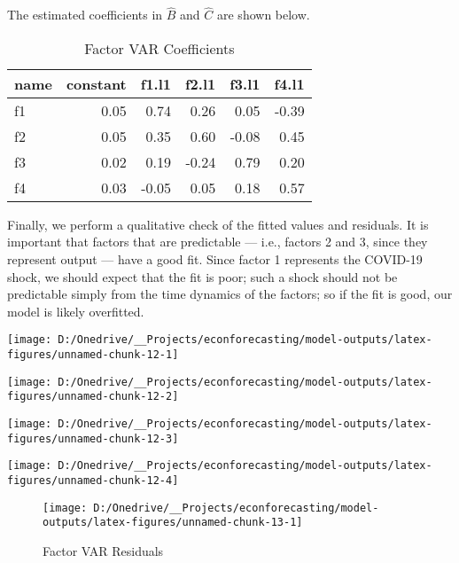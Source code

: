 \documentclass[11pt, letterpaper]{article}\usepackage[]{graphicx}\usepackage[]{color}
\begin{document}
The estimated coefficients in $\widehat{B}$ and $\widehat{C}$ are shown below.
\begin{table}[H]
\centering
\begingroup\footnotesize
\begin{tabular}{lrrrrr}
  \hline
name & constant & f1.l1 & f2.l1 & f3.l1 & f4.l1 \\ 
  \hline
f1 & 0.05 & 0.74 & 0.26 & 0.05 & -0.39 \\ 
  f2 & 0.05 & 0.35 & 0.60 & -0.08 & 0.45 \\ 
  f3 & 0.02 & 0.19 & -0.24 & 0.79 & 0.20 \\ 
  f4 & 0.03 & -0.05 & 0.05 & 0.18 & 0.57 \\ 
   \hline
\end{tabular}
\endgroup
\caption{Factor VAR Coefficients} 
\end{table}



Finally, we perform a qualitative check of the fitted values and residuals. It is important that factors that are predictable --- i.e., factors 2 and 3, since they represent output --- have a good fit. Since factor 1 represents the COVID-19 shock, we should expect that the fit is poor; such a shock should not be predictable simply from the time dynamics of the factors; so if the fit is good, our model is likely overfitted.


{\centering \texttt{[image: D:/Onedrive/\_\_Projects/econforecasting/model-outputs/latex-figures/unnamed-chunk-12-1]} 

}




{\centering \texttt{[image: D:/Onedrive/\_\_Projects/econforecasting/model-outputs/latex-figures/unnamed-chunk-12-2]} 

}




{\centering \texttt{[image: D:/Onedrive/\_\_Projects/econforecasting/model-outputs/latex-figures/unnamed-chunk-12-3]} 

}




{\centering \texttt{[image: D:/Onedrive/\_\_Projects/econforecasting/model-outputs/latex-figures/unnamed-chunk-12-4]} 

}





\begin{figure}[H]

{\centering \texttt{[image: D:/Onedrive/\_\_Projects/econforecasting/model-outputs/latex-figures/unnamed-chunk-13-1]} 

}

\caption[Factor VAR Residuals]{Factor VAR Residuals}\label{fig:unnamed-chunk-13}
\end{figure}
\end{document}
